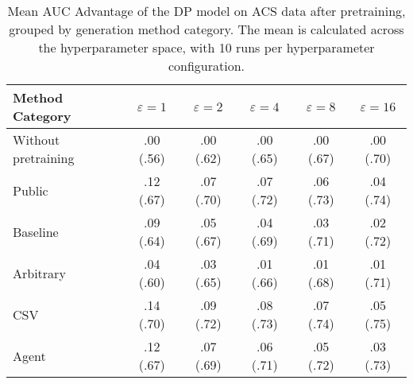 \begin{table}[h!]
    \centering
    \caption{Mean AUC Advantage of the DP model on ACS data after pretraining, grouped by generation method category. The mean is calculated across the hyperparameter space, with 10 runs per hyperparameter configuration.}
    \label{tab:epsilon_comparison}
    \begin{tabular}{lccccc}
    \toprule
    Method Category & $\varepsilon=1$ & $\varepsilon=2$ & $\varepsilon=4$ & $\varepsilon=8$ & $\varepsilon=16$ \\
    \midrule
    Without pretraining & .00 {\small (.56)} & .00 {\small (.62)} & .00 {\small (.65)} & .00 {\small (.67)} & .00 {\small (.70)} \\
    \arrayrulecolor{black!50!}\midrule
    Public & \cellcolor{silver!30}.12 {\small (.67)} & \cellcolor{silver!30}.07 {\small (.70)} & \cellcolor{silver!30}.07 {\small (.72)} & \cellcolor{silver!30}.06 {\small (.73)} & \cellcolor{silver!30}.04 {\small (.74)} \\
    \arrayrulecolor{black!50!}\midrule
    Baseline & .09 {\small (.64)} & .05 {\small (.67)} & .04 {\small (.69)} & .03 {\small (.71)} & .02 {\small (.72)} \\
    \arrayrulecolor{black!50!}\midrule
    Arbitrary & .04 {\small (.60)} & .03 {\small (.65)} & .01 {\small (.66)} & .01 {\small (.68)} & .01 {\small (.71)} \\
    \arrayrulecolor{black!50!}\midrule
    CSV & \cellcolor{gold!30}.14 {\small (.70)} & \cellcolor{gold!30}.09 {\small (.72)} & \cellcolor{gold!30}.08 {\small (.73)} & \cellcolor{gold!30}.07 {\small (.74)} & \cellcolor{gold!30}.05 {\small (.75)} \\
    Agent & \cellcolor{bronze!30}.12 {\small (.67)} & \cellcolor{bronze!30}.07 {\small (.69)} & \cellcolor{bronze!30}.06 {\small (.71)} & \cellcolor{bronze!30}.05 {\small (.72)} & \cellcolor{bronze!30}.03 {\small (.73)} \\
    \bottomrule
    \end{tabular}
\end{table}
